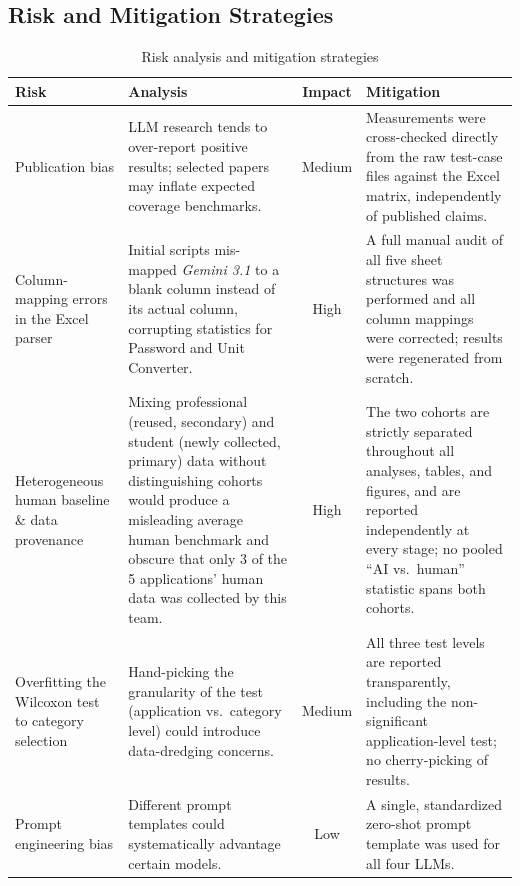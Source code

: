 \documentclass[12pt,a4paper]{article}
\begin{document}
\subsection{Risk and Mitigation Strategies}
\begin{table}[H]
\centering
\caption{Risk analysis and mitigation strategies}
\label{tab:risk}
\small
\begin{tabularx}{\textwidth}{p{3.0cm} Y c Y}
\toprule
\textbf{Risk} & \textbf{Analysis} & \textbf{Impact} & \textbf{Mitigation} \\
\midrule
Publication bias & LLM research tends to over-report positive results; selected papers may inflate expected coverage benchmarks. & Medium & Measurements were cross-checked directly from the raw test-case files against the Excel matrix, independently of published claims. \\
Column-mapping errors in the Excel parser & Initial scripts mis-mapped \textit{Gemini 3.1} to a blank column instead of its actual column, corrupting statistics for Password and Unit Converter. & High & A full manual audit of all five sheet structures was performed and all column mappings were corrected; results were regenerated from scratch. \\
Heterogeneous human baseline \& data provenance & Mixing professional (reused, secondary) and student (newly collected, primary) data without distinguishing cohorts would produce a misleading average human benchmark and obscure that only 3 of the 5 applications' human data was collected by this team. & High & The two cohorts are strictly separated throughout all analyses, tables, and figures, and are reported independently at every stage; no pooled ``AI vs.\ human'' statistic spans both cohorts. \\
Overfitting the Wilcoxon test to category selection & Hand-picking the granularity of the test (application vs.\ category level) could introduce data-dredging concerns. & Medium & All three test levels are reported transparently, including the non-significant application-level test; no cherry-picking of results. \\
Prompt engineering bias & Different prompt templates could systematically advantage certain models. & Low & A single, standardized zero-shot prompt template was used for all four LLMs. \\
\bottomrule
\end{tabularx}
\end{table}

\end{document}
